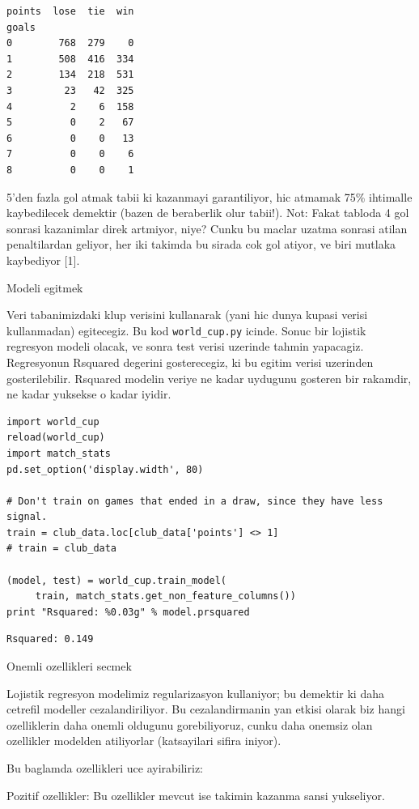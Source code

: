 \documentclass[12pt,fleqn]{article}\usepackage{../common}
\begin{document}
\begin{verbatim}
points  lose  tie  win
goals                 
0        768  279    0
1        508  416  334
2        134  218  531
3         23   42  325
4          2    6  158
5          0    2   67
6          0    0   13
7          0    0    6
8          0    0    1
\end{verbatim}

5'den fazla gol atmak tabii ki kazanmayi garantiliyor, hic atmamak 75\%
ihtimalle kaybedilecek demektir (bazen de beraberlik olur tabii!). Not:
Fakat tabloda 4 gol sonrasi kazanimlar direk artmiyor, niye? Cunku bu
maclar uzatma sonrasi atilan penaltilardan geliyor, her iki takimda bu
sirada cok gol atiyor, ve biri mutlaka kaybediyor [1].

Modeli egitmek

Veri tabanimizdaki klup verisini kullanarak (yani hic dunya kupasi verisi
kullanmadan) egitecegiz. Bu kod  \verb!world_cup.py! icinde. Sonuc bir
lojistik regresyon modeli olacak, ve sonra test verisi uzerinde tahmin
yapacagiz. Regresyonun Rsquared degerini gosterecegiz, ki bu egitim
verisi uzerinden gosterilebilir. Rsquared modelin veriye ne kadar uydugunu
gosteren bir rakamdir, ne kadar yuksekse o kadar iyidir.

\begin{verbatim}
import world_cup
reload(world_cup)
import match_stats
pd.set_option('display.width', 80)

# Don't train on games that ended in a draw, since they have less signal.
train = club_data.loc[club_data['points'] <> 1] 
# train = club_data

(model, test) = world_cup.train_model(
     train, match_stats.get_non_feature_columns())
print "Rsquared: %0.03g" % model.prsquared
\end{verbatim}

\begin{verbatim}
Rsquared: 0.149
\end{verbatim}

Onemli ozellikleri secmek

Lojistik regresyon modelimiz regularizasyon kullaniyor; bu demektir ki daha
cetrefil modeller cezalandiriliyor. Bu cezalandirmanin yan etkisi olarak
biz hangi ozelliklerin daha onemli oldugunu gorebiliyoruz, cunku daha
onemsiz olan ozellikler modelden atiliyorlar (katsayilari sifira iniyor). 

Bu baglamda ozellikleri uce ayirabiliriz:

Pozitif ozellikler: Bu ozellikler mevcut ise takimin kazanma sansi yukseliyor.
\end{document}
